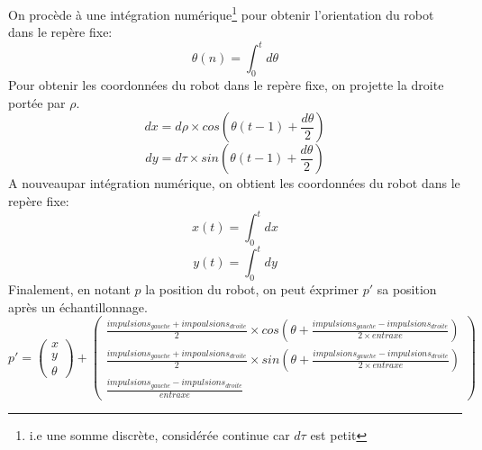         \newpage
        On procède à une intégration numérique\footnote{i.e une somme discrète, considérée continue car $d\tau$ est petit} pour obtenir l’orientation du robot dans le repère fixe:
        $$
            \theta(n) = \int_0^t d\theta
        $$
        Pour obtenir les coordonnées du robot dans le repère fixe, on projette la droite portée par $\rho$.
        \begin{equation}
            dx = d\rho \times cos(\theta(t-1) + \frac{d\theta}{2})
        \end{equation}
        \begin{equation}
            dy= d\tau \times sin(\theta(t-1) + \frac{d\theta}{2})
        \end{equation}
        A nouveaupar intégration numérique, on obtient les coordonnées du robot dans le repère fixe:
        $$ x(t) = \int_0^t dx $$
        $$ y(t) = \int_0^t dy $$
        Finalement, en notant $p$ la position du robot, on peut éxprimer $p'$ sa position après un échantillonnage.
        \begin{equation}
            p' =
            \begin{pmatrix}
                x\\
                y\\
                \theta
            \end{pmatrix} +
            \begin{pmatrix}
                \frac{impulsions_{gauche}+impoulsions_{droite}}{2}\times cos(\theta+\frac{impulsions_{gauche}-impulsions_{droite}}{2\times entraxe})\\
                \frac{impulsions_{gauche}+impoulsions_{droite}}{2}\times sin(\theta+\frac{impulsions_{gauche}-impulsions_{droite}}{2\times entraxe})\\
                \frac{impulsions_{gauche}-impulsions_{droite}}{entraxe}
            \end{pmatrix}
        \end{equation}

        \newpage
